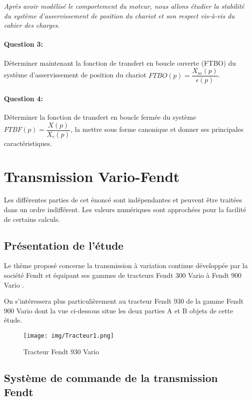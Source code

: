 \textit{Après avoir modélisé le comportement du moteur, nous allons étudier la stabilité du système d'asservissement de position du chariot et son respect vis-à-vis du cahier des charges.}

\paragraph{Question 3:} Déterminer maintenant la fonction de transfert en boucle ouverte (FTBO) du système d'asservissement de position du chariot $FTBO(p)=\dfrac{X_m(p)}{\epsilon(p)}$.

\paragraph{Question 4:} Déterminer la fonction de transfert en boucle fermée du système $FTBF(p)=\dfrac{X(p)}{X_c(p)}$, la mettre sous forme canonique et donner ses principales caractéristiques.

\newpage

\section{Transmission Vario-Fendt}

Les différentes parties de cet énoncé sont indépendantes et peuvent être traitées dans un ordre indifférent. Les valeurs numériques sont approchées pour la facilité de certains calculs.

\subsection{Présentation de l'étude}

Le thème proposé concerne la transmission à variation continue développée par la société Fendt et équipant ses gammes de tracteurs \og Fendt 300 Vario \fg à \og Fendt 900 Vario \fg.

On s'intéressera plus particulièrement au tracteur Fendt 930 de la gamme \og Fendt 900 Vario \fg dont la vue ci-dessous situe les deux parties A et B objets de cette étude.

\begin{figure}[!h]
\centering\texttt{[image: img/Tracteur1.png]}
\caption{Tracteur Fendt 930 Vario}
\label{fig1}
\end{figure}

\subsection{Système de commande de la transmission Fendt}

